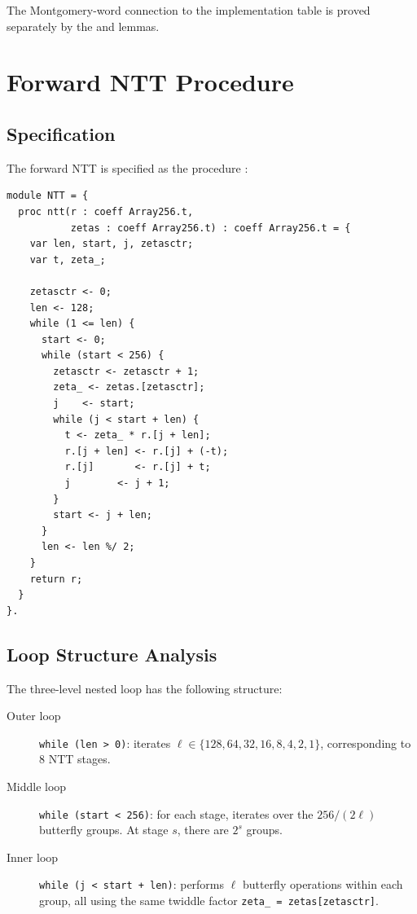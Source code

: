 The Montgomery-word connection to the implementation table is proved
separately by the  and  lemmas.

\section{Forward NTT Procedure}

\subsection{Specification}

The forward NTT is specified as the \easycrypt{} procedure :

\begin{lstlisting}[language=EasyCrypt,
  caption={Forward NTT specification in \texttt{NTT\_Fq.ec}},
  label={lst:ntt_spec}]
module NTT = {
  proc ntt(r : coeff Array256.t,
           zetas : coeff Array256.t) : coeff Array256.t = {
    var len, start, j, zetasctr;
    var t, zeta_;

    zetasctr <- 0;
    len <- 128;
    while (1 <= len) {
      start <- 0;
      while (start < 256) {
        zetasctr <- zetasctr + 1;
        zeta_ <- zetas.[zetasctr];
        j    <- start;
        while (j < start + len) {
          t <- zeta_ * r.[j + len];
          r.[j + len] <- r.[j] + (-t);
          r.[j]       <- r.[j] + t;
          j        <- j + 1;
        }
        start <- j + len;
      }
      len <- len %/ 2;
    }
    return r;
  }
}.
\end{lstlisting}

\subsection{Loop Structure Analysis}

The three-level nested loop has the following structure:
\begin{description}
  \item[Outer loop] \texttt{while (len > 0)}: iterates $\ell \in
        \{128, 64, 32, 16, 8, 4, 2, 1\}$, corresponding to 8 NTT stages.

  \item[Middle loop] \texttt{while (start < 256)}: for each stage, iterates
        over the $256 / (2\ell)$ butterfly groups.  At stage $s$, there are
        $2^s$ groups.

  \item[Inner loop] \texttt{while (j < start + len)}: performs $\ell$
        butterfly operations within each group, all using the same twiddle
        factor \texttt{zeta\_ = zetas[zetasctr]}.
\end{description}


